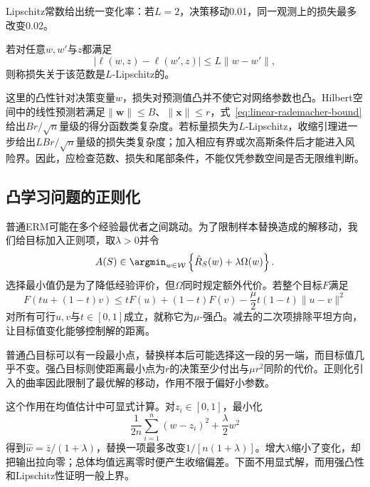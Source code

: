 Lipschitz常数给出统一变化率：若$L=2$，决策移动0.01，同一观测上的损失最多改变0.02。

\begin{definition}[Lipschitz损失]
\label{def:lipschitz-loss}
若对任意$w,w'$与$z$都满足
\begin{equation}
 |\ell(w,z)-\ell(w',z)|\leq L\|w-w'\|,
 \label{eq:lipschitz-loss}
\end{equation}
则称损失关于该范数是$L$-Lipschitz的。
\end{definition}

这里的凸性针对决策变量$w$，损失对预测值凸并不使它对网络参数也凸。Hilbert空间中的线性预测若满足$\|\bm w\|\leq B$、$\|\bm x\|\leq r$，式~\eqref{eq:linear-rademacher-bound}给出$Br/\sqrt n$量级的得分函数类复杂度。若标量损失为$L$-Lipschitz，收缩引理进一步给出$LBr/\sqrt n$量级的损失类复杂度；加入相应有界或次高斯条件后才能进入风险界。因此，应检查范数、损失和尾部条件，不能仅凭参数空间是否无限维判断。

\subsection{凸学习问题的正则化}

普通ERM可能在多个经验最优者之间跳动。为了限制样本替换造成的解移动，我们给目标加入正则项，取$\lambda>0$并令
\begin{equation}
 A(S)\in\argmin_{w\in\mathcal W}
 \left\{\hat R_S(w)+\lambda\Omega(w)\right\}.
 \label{eq:regularized-erm}
\end{equation}
选择最小值仍是为了降低经验评价，但$\Omega$同时规定额外代价。若整个目标$F$满足
\begin{equation}
 F(tu+(1-t)v)\leq tF(u)+(1-t)F(v)
 -\frac\mu2t(1-t)\|u-v\|^2
 \label{eq:strong-convexity}
\end{equation}
对所有可行$u,v$与$t\in[0,1]$成立，就称它为$\mu$-强凸。减去的二次项排除平坦方向，让目标值变化能够控制解的距离。

普通凸目标可以有一段最小点，替换样本后可能选择这一段的另一端，而目标值几乎不变。强凸目标则使距离最小点为$r$的决策至少付出与$\mu r^2$同阶的代价。正则化引入的曲率因此限制了最优解的移动，作用不限于偏好小参数。

这个作用在均值估计中可显式计算。对$z_i\in[0,1]$，最小化
\[
 \frac1{2n}\sum_{i=1}^n(w-z_i)^2+\frac\lambda2w^2
\]
得到$\hat w=\bar z/(1+\lambda)$，替换一项最多改变$1/[n(1+\lambda)]$。增大$\lambda$缩小了变化，却把输出拉向零；总体均值远离零时便产生收缩偏差。下面不用显式解，而用强凸性和Lipschitz性证明一般上界。

